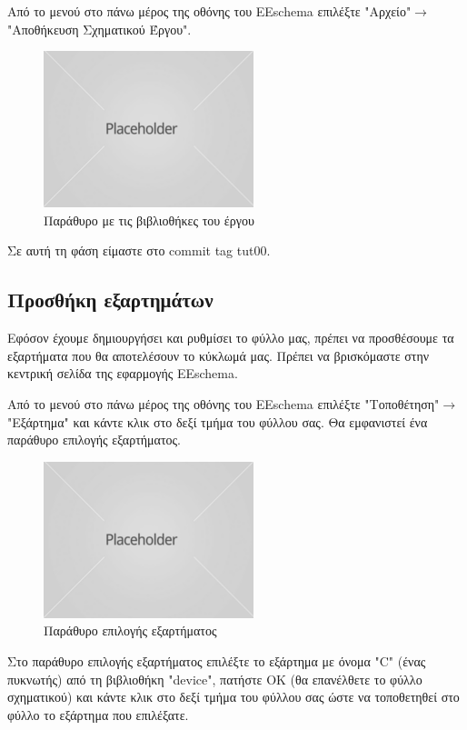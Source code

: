 \documentclass[a4paper]{article}
\begin{document}
Από το μενού στο πάνω μέρος της οθόνης του EEschema επιλέξτε "Αρχείο"$\rightarrow$"Αποθήκευση Σχηματικού Έργου".

\begin{figure}
  \begin{center}
    \includegraphics{img/kicad-main.png}
    \caption{Παράθυρο με τις βιβλιοθήκες του έργου}
    \label{fig:kicad-main}
  \end{center}
\end{figure}

Σε αυτή τη φάση είμαστε στο commit tag tut00.

\subsection{Προσθήκη εξαρτημάτων}
Εφόσον έχουμε δημιουργήσει και ρυθμίσει το φύλλο μας, πρέπει να προσθέσουμε τα εξαρτήματα που θα αποτελέσουν το κύκλωμά μας. Πρέπει να βρισκόμαστε στην κεντρική σελίδα της εφαρμογής EEschema.

Από το μενού στο πάνω μέρος της οθόνης του EEschema επιλέξτε "Τοποθέτηση"$\rightarrow$"Εξάρτημα" και κάντε κλικ στο δεξί τμήμα του φύλλου σας. Θα εμφανιστεί ένα παράθυρο επιλογής εξαρτήματος.

\begin{figure}
  \begin{center}
    \includegraphics{img/kicad-main.png}
    \caption{Παράθυρο επιλογής εξαρτήματος}
    \label{fig:kicad-main}
  \end{center}
\end{figure}

Στο παράθυρο επιλογής εξαρτήματος επιλέξτε το εξάρτημα με όνομα "C" (ένας πυκνωτής) από τη βιβλιοθήκη "device", πατήστε ΟΚ (θα επανέλθετε το φύλλο σχηματικού) και κάντε κλικ στο δεξί τμήμα του φύλλου σας ώστε να τοποθετηθεί στο φύλλο το εξάρτημα που επιλέξατε. 
\end{document}
